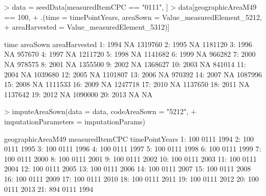 \documentclass[nojss]{jss}
\begin{document}
\begin{Schunk}
\begin{Sinput}
> data = seedData[measuredItemCPC == "0111", ]
> data[geographicAreaM49 == 100,
+      .(time = timePointYears, areaSown = Value_measuredElement_5212,
+        areaHarvested = Value_measuredElement_5312)]
\end{Sinput}
\begin{Soutput}
    time areaSown areaHarvested
 1: 1994       NA       1319760
 2: 1995       NA       1181120
 3: 1996       NA        957670
 4: 1997       NA       1211720
 5: 1998       NA       1141682
 6: 1999       NA        966282
 7: 2000       NA        978575
 8: 2001       NA       1355500
 9: 2002       NA       1368627
10: 2003       NA        841014
11: 2004       NA       1039680
12: 2005       NA       1101807
13: 2006       NA        970392
14: 2007       NA       1087996
15: 2008       NA       1111533
16: 2009       NA       1247718
17: 2010       NA       1137650
18: 2011       NA       1137642
19: 2012       NA       1090000
20: 2013       NA            NA
\end{Soutput}
\begin{Sinput}
> imputeAreaSown(data = data, codeAreaSown = "5212",
+                imputationParameters = imputationParams)
\end{Sinput}
\begin{Soutput}
     geographicAreaM49 measuredItemCPC timePointYears
  1:               100            0111           1994
  2:               100            0111           1995
  3:               100            0111           1996
  4:               100            0111           1997
  5:               100            0111           1998
  6:               100            0111           1999
  7:               100            0111           2000
  8:               100            0111           2001
  9:               100            0111           2002
 10:               100            0111           2003
 11:               100            0111           2004
 12:               100            0111           2005
 13:               100            0111           2006
 14:               100            0111           2007
 15:               100            0111           2008
 16:               100            0111           2009
 17:               100            0111           2010
 18:               100            0111           2011
 19:               100            0111           2012
 20:               100            0111           2013
 21:               894            0111           1994

\end{Soutput}
\end{Schunk}
\end{document}
